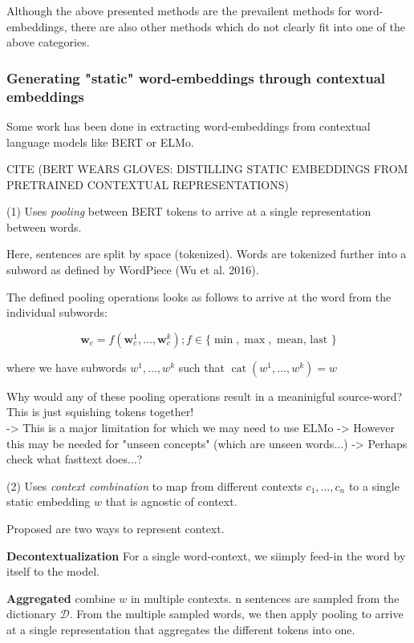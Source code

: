 \documentclass[a4paper,12pt,twoside,openright]{report}
\begin{document}
Although the above presented methods are the prevailent methods for word-embeddings, there are also other methods which do not clearly fit into one of the above categories.

\subsubsection{Generating "static" word-embeddings through contextual embeddings}

Some work has been done in extracting word-embeddings from contextual language models like BERT or ELMo.

CITE (BERT WEARS GLOVES: DISTILLING STATIC EMBEDDINGS FROM PRETRAINED CONTEXTUAL REPRESENTATIONS)

(1) Uses \textit{pooling} between BERT tokens to arrive at a single representation between words.

Here, sentences are split by space (tokenized).
Words are tokenized further into a subword as defined by WordPiece (Wu et al. 2016).

The defined pooling operations looks as follows to arrive at the word from the individual subwords:

$$
\mathbf{w}_{c}=f\left(\mathbf{w}_{c}^{1}, \ldots, \mathbf{w}_{c}^{k}\right) ; f \in\{\min , \max , \text { mean, last }\}
$$

where we have subwords $w^{1},  \ldots, w^{k}$ such that $\operatorname{cat}\left(w^{1}, \ldots, w^{k}\right)=w$

Why would any of these pooling operations result in a meaninigful source-word? 
This is just squishing tokens together! \\

-> This is a major limitation for which we may need to use ELMo
-> However this may be needed for "unseen concepts" (which are unseen words...)
-> Perhaps check what fasttext does...?


(2) Uses \textit{context combination} to map from different contexts $c_1, \ldots, c_n$ to a single static embedding $w$ that is agnostic of context.

Proposed are two ways to represent context.

\textbf{Decontextualization} For a single word-context, we siimply feed-in the word by itself to the model.

\textbf{Aggregated} combine $w$ in multiple contexts.
n sentences are sampled from the dictionary $\mathcal{D}$.
From the multiple sampled words, we then apply pooling to arrive at a single representation that aggregates the different tokens into one.
\end{document}

